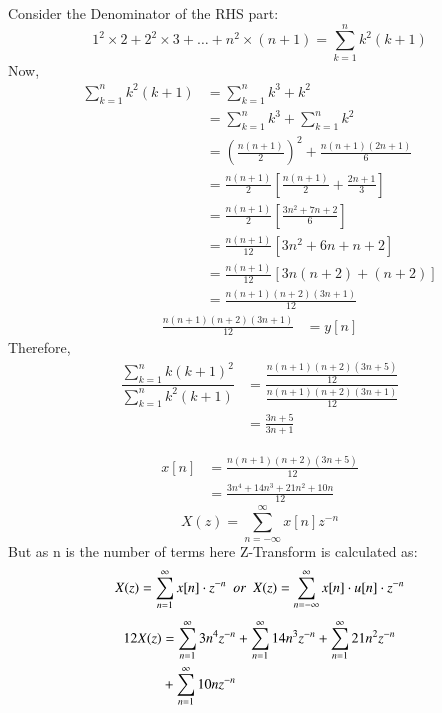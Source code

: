 \documentclass[journal,12pt,twocolumn]{IEEEtran}
\theoremstyle{remark}
\begin{document}
Consider the Denominator of the RHS part:
\begin{equation*}
    1^2\times2 + 2^2\times3 +\dots + n^2\times(n+1) = \sum_{k=1}^n k^2(k+1)
\end{equation*}
Now,\\
\begin{align*}
     \sum_{k=1}^n k^2(k+1) &= \sum_{k=1}^n k^3+k^2\\
                           &=  \sum_{k=1}^n k^3 + \sum_{k=1}^n k^2\\
                           &=  \left(\frac{n(n+1)}{2}\right)^{\scriptstyle 2}+\frac{n(n+1)(2n+1)}{6}\\ 
                           &= \frac{n(n+1)}{2}\left[\frac{n(n+1)}{2} +\frac{2n+1}{3}\right]\\
                           &= \frac{n(n+1)}{2}\left[\frac{3n^2+7n+2}{6}\right]\\
                           &= \frac{n(n+1)}{12}\left[3n^2+6n + n+2\right]\\
                           &= \frac{n(n+1)}{12}\left[3n(n+2)+(n+2)\right]\\
                           &= \frac{n(n+1)(n+2)(3n+1)}{12}
\end{align*}
\begin{align*}
    \frac{n(n+1)(n+2)(3n+1)}{12} &= y[n]
\end{align*}
\vspace{1cm}
Therefore,
\begin{align*}
     \dfrac{ \sum_{k=1}^n k(k+1)^2 }{\sum_{k=1}^n k^2(k+1)} &= \dfrac{\frac{n(n+1)(n+2)(3n+5)}{12}}{\frac{n(n+1)(n+2)(3n+1)}{12}}\\
                                                            &= \frac{3n+5}{3n+1}
\end{align*}
\vspace{0.7cm}


\newpage
\begin{align*}
    x[n] &= \frac{n(n+1)(n+2)(3n+5)}{12}\\
         &= \frac{3n^4 + 14n^3 + 21n^2 + 10n}{12}\
\end{align*}
\begin{equation}
    X(z) = \sum_{n=-\infty}^\infty x[n]z^{-n}
\end{equation}
But as n is the number of terms here Z-Transform is calculated as:
\begin{equation}
    X(z) = \sum_{n=1}^\infty x[n]\cdot z^{-n} \hspace{5pt} or \hspace{5pt}   X(z) = \sum_{n=-\infty}^\infty x[n]\cdot u[n]\cdot z^{-n}\notag
\end{equation}
\begin{align}
    12X(z) &= \sum_{n=1}^\infty 3n^4z^{-n} +  \sum_{n=1}^\infty 14n^3z^{-n} +  \sum_{n=1}^\infty 21n^2 z^{-n}\\   &+\sum_{n=1}^\infty 10nz^{-n}\notag
\end{align}
\\
\end{document}
